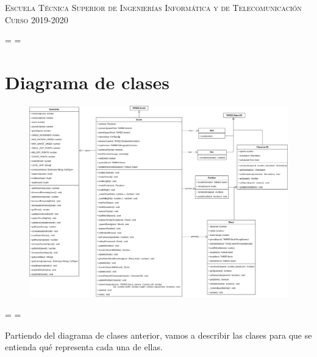 \documentclass[11pt,a4paper]{article}
\begin{document}
\begin{titlepage}
\begin{minipage}{\textwidth}
\vspace{0.7cm}
\textsc{Escuela Técnica Superior de Ingenierías Informática y de Telecomunicación}\\
\vspace{1cm}
\textsc{Curso 2019-2020}
\end{minipage}
\end{titlepage}

\tableofcontents
\thispagestyle{empty}				%

%

\recalctypearea
\pdfpageheight=\paperheight
\pdfpagewidth=\paperwidth
\pagestyle{lscape}


\setlength{\parskip}{1em}

\section{Diagrama de clases}

\begin{figure}[H]
  \centering
  \includegraphics[scale=0.365]{img/diagrama-clases}
\end{figure}

\recalctypearea
\pdfpageheight=\paperheight
\pdfpagewidth=\paperwidth
\headwidth\textwidth

Partiendo del diagrama de clases anterior, vamos a describir las clases para que se entienda
qué representa cada una de ellas.
\end{document}
